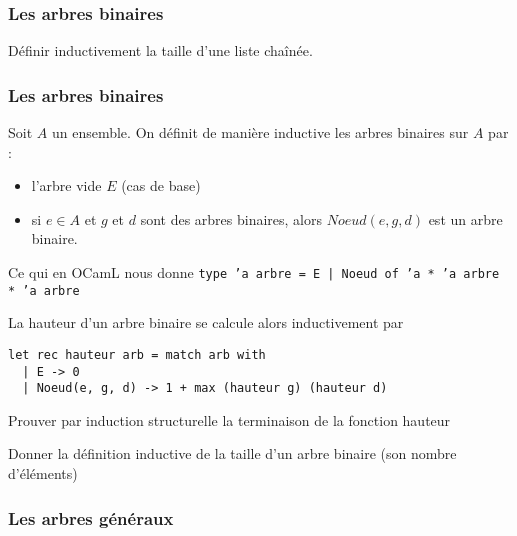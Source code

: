 \subsubsection{Les arbres binaires}

\begin{exercise}
	Définir inductivement la taille d'une liste chaînée.
\end{exercise}

\subsubsection{Les arbres binaires}

\begin{definition}
	Soit $A$ un ensemble. On définit de manière inductive les arbres binaires sur $A$ par : \begin{itemize}
		\item l'arbre vide $E$ (cas de base)
		\item si $e\in A$ et $g$ et $d$ sont des arbres binaires, alors $Noeud(e,g,d)$ est un arbre binaire.
	\end{itemize}
\end{definition}

\begin{impl}
	Ce qui en OCamL nous donne \texttt{type 'a arbre = E | Noeud of 'a * 'a arbre * 'a arbre}
\end{impl}

\begin{example}
	La hauteur d'un arbre binaire se calcule alors inductivement par \begin{lstlisting}
let rec hauteur arb = match arb with
  | E -> 0
  | Noeud(e, g, d) -> 1 + max (hauteur g) (hauteur d)
	\end{lstlisting}
\end{example}

\begin{exercise}
	Prouver par induction structurelle la terminaison de la fonction hauteur
\end{exercise}

\begin{exercise}
	Donner la définition inductive de la taille d'un arbre binaire (son nombre d'éléments)
\end{exercise}

\subsubsection{Les arbres généraux}

